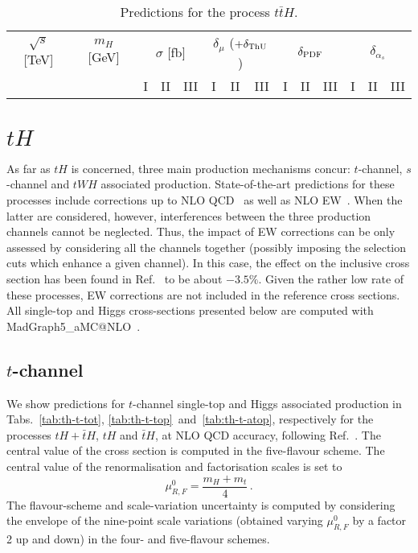 \documentclass[a4paper,usenames,dvipsnames,11pt]{article}
\begin{document}
\begin{table}
    \centering
    \begin{tabular}{cccccccccccccc}
        $\sqrt{s}$ [TeV]  &  $m_H$ [GeV]  & \multicolumn{3}{c}{$\sigma$ [fb]}  & \multicolumn{3}{c}{$\delta_{\mu}$ ($+\delta_{\rm ThU}$)}   &  \multicolumn{3}{c}{$\delta_{\rm PDF}$}   
        & \multicolumn{3}{c}{$\delta_{\alpha_s}$}\\
         & & I & II & III & I & II & III & I & II & III & I & II & III\\
        \hline
    \end{tabular}
    \caption{\label{tab:tth} Predictions for the process $t \bar t H$.}
\end{table}
\clearpage


\section{$tH$}
As far as $tH$ is concerned, three main production mechanisms concur: $t$-channel, $s$-channel and $tWH$ associated production. State-of-the-art predictions
for these processes include corrections up to NLO QCD~\cite{Demartin:2015uha,Demartin:2016axk} as well as NLO EW~\cite{Pagani:2020mov}. When
the latter are considered, however, interferences between the three production channels cannot be neglected. Thus, the impact of EW corrections can be only assessed
by considering all the channels together (possibly imposing the selection cuts which enhance a given channel). In this case, the effect on the inclusive
cross section has been found in Ref.~\cite{Pagani:2020mov} to be about $-3.5\%$. Given the rather low rate of these processes, EW
corrections are not included in the reference cross sections.\\

All single-top and Higgs cross-sections presented below are computed with {\sc MadGraph5\_aMC@NLO}~\cite{Alwall:2014hca,Frederix:2018nkq}. 

\subsection{$t$-channel}
We show predictions for $t$-channel single-top and Higgs associated production in Tabs.~\ref{tab:th-t-tot}, \ref{tab:th-t-top}~and~\ref{tab:th-t-atop},
respectively for the processes $tH + \bar t H$, $tH$ and $\bar t H$, at NLO QCD accuracy, following Ref.~\cite{Demartin:2015uha}. The 
central value of the cross section is computed in the five-flavour scheme. 
The central value of the renormalisation and factorisation scales is set to
\begin{equation}
    \mu_{R,F}^0 = \frac{m_H+m_t}{4}\,.
\end{equation}
The flavour-scheme and scale-variation uncertainty is computed by considering the envelope of the 
nine-point scale variations (obtained varying $ \mu_{R,F}^0$ by a factor 2 up and down) in the four- and five-flavour schemes.
\end{document}
